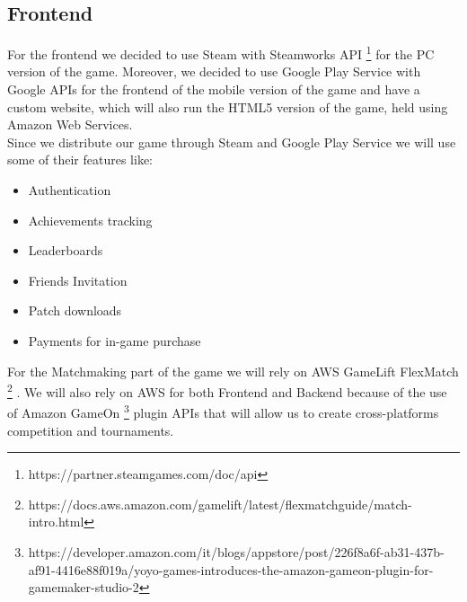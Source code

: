 \subsection{Frontend}
For the frontend we decided to use Steam with Steamworks API \footnote{https://partner.steamgames.com/doc/api} for the PC version of the game. Moreover, we decided to use Google Play Service with Google APIs for the frontend of the mobile version of the game and have a custom website, which will also run the HTML5 version of the game, held using Amazon Web Services.\\
Since we distribute our game through Steam and Google Play Service we will use some of their features like:
\begin{itemize}
\item Authentication
\item Achievements tracking
\item Leaderboards
\item Friends Invitation
\item Patch downloads
\item Payments for in-game purchase
\end{itemize}
For the Matchmaking part of the game we will rely on AWS GameLift FlexMatch \footnote{https://docs.aws.amazon.com/gamelift/latest/flexmatchguide/match-intro.html} . We will also rely on AWS for both Frontend and Backend because of the use of Amazon GameOn \footnote{https://developer.amazon.com/it/blogs/appstore/post/226f8a6f-ab31-437b-af91-4416e88f019a/yoyo-games-introduces-the-amazon-gameon-plugin-for-gamemaker-studio-2} plugin APIs that will allow us to create cross-platforms competition and tournaments.\\
 
